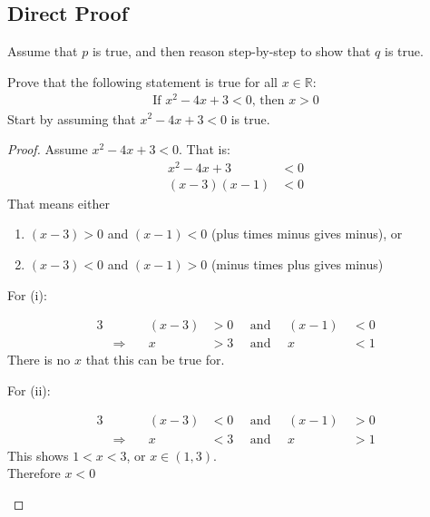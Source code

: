 \documentclass[../notes.tex]{subfiles}
\begin{document}
			\subsection{Direct Proof}
				Assume that $p$ is true, and then reason step-by-step to show that $q$ is true.
				\begin{example}
					Prove that the following statement is true for all $x \in \mathbb{R}$:
					\begin{align*}
						\text{If } x^{2} - 4x + 3 < 0 \text{, then } x > 0
					\end{align*}
					Start by assuming that $x^{2} - 4x + 3 < 0$ is true.
					\begin{proof}
						Assume $x^{2} - 4x + 3 < 0$. That is:
						\begin{align*}
							x^{2} - 4x + 3 &< 0\\
							(x - 3)(x - 1) &< 0 \tag*{(by factorisation)}
						\end{align*}
						That means either 
							\begin{enumerate}[label=(\roman*)]
								\item $(x - 3) > 0$ and $(x - 1) < 0$ (plus times minus gives minus), or
								\item $(x - 3) < 0$ and $(x - 1) > 0$ (minus times plus gives minus)
							\end{enumerate}
						For (i):
						\begin{indentparagraph}
							\begin{alignat*}{3}
								& & (x - 3) &> 0 \quad \text{ and }\quad  (x - 1) \: &< 0\\
								& \Rightarrow \quad & x &> 3 \quad \text{ and } \quad x &< 1
							\end{alignat*}
							There is no $x$ that this can be true for.
						\end{indentparagraph}
						For (ii):
						\begin{indentparagraph}
							\begin{alignat*}{3}
								& & (x - 3) &< 0 \quad \text{ and }\quad  (x - 1) \: &> 0\\
								& \Rightarrow \quad & x &< 3 \quad \text{ and } \quad x &> 1
							\end{alignat*}
							This shows $1 < x < 3$, or $x \in (1, 3)$.\\
							Therefore $x < 0$ \qedhere
						\end{indentparagraph}
					\end{proof}
				\end{example}
			\pagebreak
\end{document}
